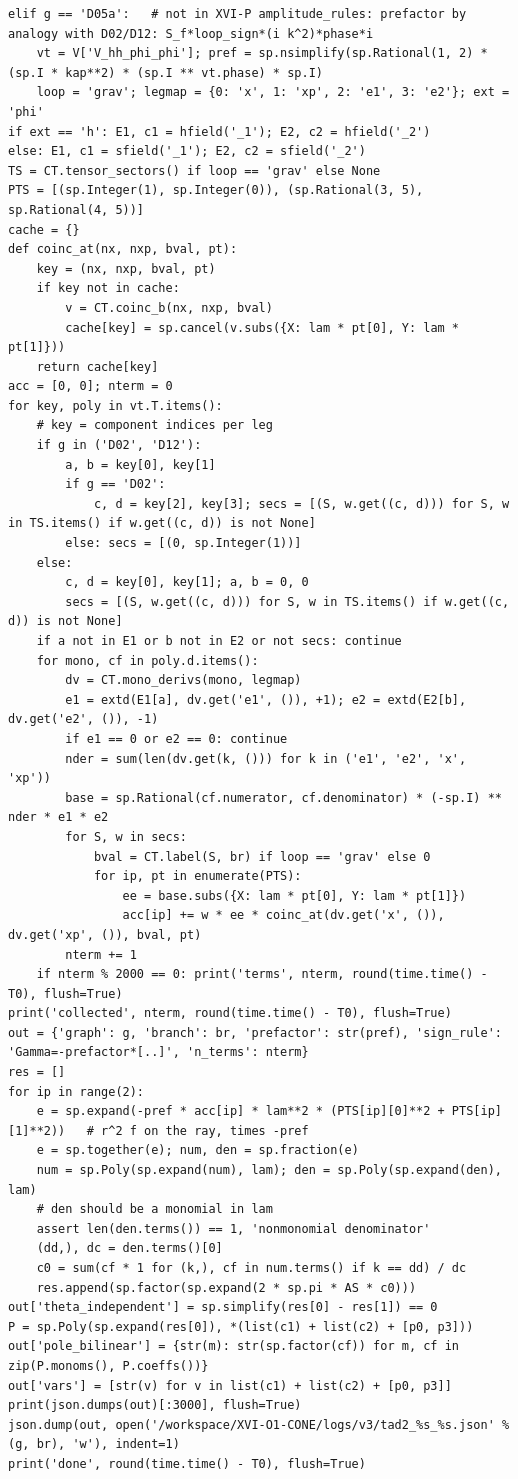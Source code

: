 \documentclass[10pt]{article}
\begin{document}
\begin{lstlisting}
elif g == 'D05a':   # not in XVI-P amplitude_rules: prefactor by analogy with D02/D12: S_f*loop_sign*(i k^2)*phase*i
    vt = V['V_hh_phi_phi']; pref = sp.nsimplify(sp.Rational(1, 2) * (sp.I * kap**2) * (sp.I ** vt.phase) * sp.I)
    loop = 'grav'; legmap = {0: 'x', 1: 'xp', 2: 'e1', 3: 'e2'}; ext = 'phi'
if ext == 'h': E1, c1 = hfield('_1'); E2, c2 = hfield('_2')
else: E1, c1 = sfield('_1'); E2, c2 = sfield('_2')
TS = CT.tensor_sectors() if loop == 'grav' else None
PTS = [(sp.Integer(1), sp.Integer(0)), (sp.Rational(3, 5), sp.Rational(4, 5))]
cache = {}
def coinc_at(nx, nxp, bval, pt):
    key = (nx, nxp, bval, pt)
    if key not in cache:
        v = CT.coinc_b(nx, nxp, bval)
        cache[key] = sp.cancel(v.subs({X: lam * pt[0], Y: lam * pt[1]}))
    return cache[key]
acc = [0, 0]; nterm = 0
for key, poly in vt.T.items():
    # key = component indices per leg
    if g in ('D02', 'D12'):
        a, b = key[0], key[1]
        if g == 'D02':
            c, d = key[2], key[3]; secs = [(S, w.get((c, d))) for S, w in TS.items() if w.get((c, d)) is not None]
        else: secs = [(0, sp.Integer(1))]
    else:
        c, d = key[0], key[1]; a, b = 0, 0
        secs = [(S, w.get((c, d))) for S, w in TS.items() if w.get((c, d)) is not None]
    if a not in E1 or b not in E2 or not secs: continue
    for mono, cf in poly.d.items():
        dv = CT.mono_derivs(mono, legmap)
        e1 = extd(E1[a], dv.get('e1', ()), +1); e2 = extd(E2[b], dv.get('e2', ()), -1)
        if e1 == 0 or e2 == 0: continue
        nder = sum(len(dv.get(k, ())) for k in ('e1', 'e2', 'x', 'xp'))
        base = sp.Rational(cf.numerator, cf.denominator) * (-sp.I) ** nder * e1 * e2
        for S, w in secs:
            bval = CT.label(S, br) if loop == 'grav' else 0
            for ip, pt in enumerate(PTS):
                ee = base.subs({X: lam * pt[0], Y: lam * pt[1]})
                acc[ip] += w * ee * coinc_at(dv.get('x', ()), dv.get('xp', ()), bval, pt)
        nterm += 1
    if nterm % 2000 == 0: print('terms', nterm, round(time.time() - T0), flush=True)
print('collected', nterm, round(time.time() - T0), flush=True)
out = {'graph': g, 'branch': br, 'prefactor': str(pref), 'sign_rule': 'Gamma=-prefactor*[..]', 'n_terms': nterm}
res = []
for ip in range(2):
    e = sp.expand(-pref * acc[ip] * lam**2 * (PTS[ip][0]**2 + PTS[ip][1]**2))   # r^2 f on the ray, times -pref
    e = sp.together(e); num, den = sp.fraction(e)
    num = sp.Poly(sp.expand(num), lam); den = sp.Poly(sp.expand(den), lam)
    # den should be a monomial in lam
    assert len(den.terms()) == 1, 'nonmonomial denominator'
    (dd,), dc = den.terms()[0]
    c0 = sum(cf * 1 for (k,), cf in num.terms() if k == dd) / dc
    res.append(sp.factor(sp.expand(2 * sp.pi * AS * c0)))
out['theta_independent'] = sp.simplify(res[0] - res[1]) == 0
P = sp.Poly(sp.expand(res[0]), *(list(c1) + list(c2) + [p0, p3]))
out['pole_bilinear'] = {str(m): str(sp.factor(cf)) for m, cf in zip(P.monoms(), P.coeffs())}
out['vars'] = [str(v) for v in list(c1) + list(c2) + [p0, p3]]
print(json.dumps(out)[:3000], flush=True)
json.dump(out, open('/workspace/XVI-O1-CONE/logs/v3/tad2_%s_%s.json' % (g, br), 'w'), indent=1)
print('done', round(time.time() - T0), flush=True)
\end{lstlisting}
\end{document}
